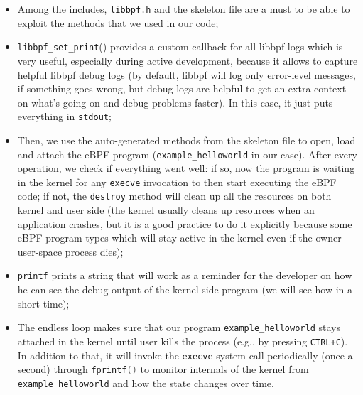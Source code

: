 \begin{itemize}
	\item 
		Among the includes, \colorbox{backcolour}{\lstinline[style=cstyle, language=C]|libbpf.h|} and the skeleton file are a must to be able to exploit the methods that we used in our code;
	\item 
		\colorbox{backcolour}{\lstinline[style=cstyle, language=C]|libbpf_set_print|()} provides a custom callback for all libbpf logs which is very useful, especially during active development, because it allows to capture helpful libbpf debug logs (by default, libbpf will log only error-level messages, if something goes wrong, but debug logs are helpful to get an extra context on what's going on and debug problems faster).
		In this case, it just puts everything in \colorbox{backcolour}{\lstinline[style=highlight, language=bash]|stdout|};
	\item 
		Then, we use the auto-generated methods from the skeleton file to open, load and attach the eBPF program (\colorbox{backcolour}{\lstinline[style=highlight, language=bash]|example_helloworld|} in our case). 
		After every operation, we check if everything went well: if so, now the program is waiting in the kernel for any \colorbox{backcolour}{\lstinline[style=highlight, language=bash]|execve|} invocation to then start executing the eBPF code; if not, the \colorbox{backcolour}{\lstinline[style=highlight, language=bash]|destroy|} method will clean up all the resources on both kernel and user side (the kernel usually cleans up resources when an application crashes, but it is a good practice to do it explicitly because some eBPF program types which will stay active in the kernel even if the owner user-space process dies);
	\item 
		\colorbox{backcolour}{\lstinline[style=cstyle, language=C]|printf|} prints a string that will work as a reminder for the developer on how he can see the debug output of the kernel-side program (we will see how in a short time);
	\item 
		The endless loop makes sure that our program \colorbox{backcolour}{\lstinline[style=highlight, language=bash]|example_helloworld|} stays attached in the kernel until user kills the process (e.g., by pressing \colorbox{backcolour}{\lstinline[style=highlight, language=bash]|CTRL+C|}). 
		In addition to that, it will invoke the \colorbox{backcolour}{\lstinline[style=highlight, language=bash]|execve|} system call periodically (once a second) through \colorbox{backcolour}{\lstinline[style=cstyle, language=C]|fprintf()|} to monitor internals of the kernel from \colorbox{backcolour}{\lstinline[style=highlight, language=bash]|example_helloworld|} and how the state changes over time.
\end{itemize}

